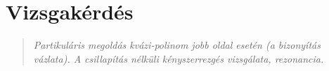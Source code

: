 \newpage
\section{Vizsgakérdés}
\begin{quote}
	\textit{Partikuláris megoldás kvázi-polinom jobb oldal esetén (a bizonyítás vázlata). A csillapítás nélküli kényszerrezgés vizsgálata, rezonancia.}
\end{quote}